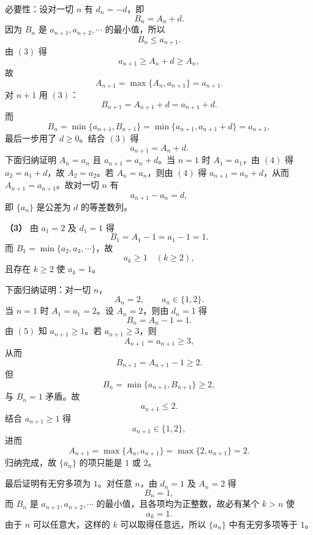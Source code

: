 \begin{answer}
必要性：设对一切 $n$ 有 $d_n=-d$，即
\nopagebreak[4]
\[B_n=A_n+d. \tag{3}\]
因为 $B_n$ 是 $a_{n+1},a_{n+2},\cdots$ 的最小值，所以
\nopagebreak[4]
\[B_n\leqslant a_{n+1}.\]
由 $(3)$ 得
\nopagebreak[4]
\[a_{n+1}\geqslant A_n+d\geqslant A_n,\]
故
\nopagebreak[4]
\[A_{n+1}=\max\{A_n,a_{n+1}\}=a_{n+1}.\]
对 $n+1$ 用 $(3)$：
\nopagebreak[4]
\[B_{n+1}=A_{n+1}+d=a_{n+1}+d.\]
而
\nopagebreak[4]
\[B_n=\min\{a_{n+1},B_{n+1}\}=\min\{a_{n+1},a_{n+1}+d\}=a_{n+1},\]
最后一步用了 $d\geqslant0$。结合 $(3)$ 得
\nopagebreak[4]
\[a_{n+1}=A_n+d. \tag{4}\]
下面归纳证明 $A_n=a_n$ 且 $a_{n+1}=a_n+d$。当 $n=1$ 时 $A_1=a_1$，由 $(4)$ 得 $a_2=a_1+d$，故 $A_2=a_2$。若 $A_n=a_n$，则由 $(4)$ 得 $a_{n+1}=a_n+d$，从而 $A_{n+1}=a_{n+1}$。故对一切 $n$ 有
\nopagebreak[4]
\[a_{n+1}-a_n=d,\]
即 $\{a_n\}$ 是公差为 $d$ 的等差数列。

\textbf{（3）} 由 $a_1=2$ 及 $d_1=1$ 得
\nopagebreak[4]
\[B_1=A_1-1=a_1-1=1.\]
而 $B_1=\min\{a_2,a_3,\cdots\}$，故
\nopagebreak[4]
\[a_k\geqslant1\quad(k\geqslant2), \tag{5}\]
且存在 $k\geqslant2$ 使 $a_k=1$。

下面归纳证明：对一切 $n$，
\nopagebreak[4]
\[A_n=2,\qquad a_n\in\{1,2\}.\]
当 $n=1$ 时 $A_1=a_1=2$。设 $A_n=2$，则由 $d_n=1$ 得
\nopagebreak[4]
\[B_n=A_n-1=1.\]
由 $(5)$ 知 $a_{n+1}\geqslant1$。若 $a_{n+1}\geqslant3$，则
\nopagebreak[4]
\[A_{n+1}=a_{n+1}\geqslant3,\]
从而
\nopagebreak[4]
\[B_{n+1}=A_{n+1}-1\geqslant2.\]
但
\nopagebreak[4]
\[B_n=\min\{a_{n+1},B_{n+1}\}\geqslant2,\]
与 $B_n=1$ 矛盾。故
\nopagebreak[4]
\[a_{n+1}\leqslant2.\]
结合 $a_{n+1}\geqslant1$ 得
\nopagebreak[4]
\[a_{n+1}\in\{1,2\},\]
进而
\nopagebreak[4]
\[A_{n+1}=\max\{A_n,a_{n+1}\}=\max\{2,a_{n+1}\}=2.\]
归纳完成，故 $\{a_n\}$ 的项只能是 $1$ 或 $2$。

最后证明有无穷多项为 $1$。对任意 $n$，由 $d_n=1$ 及 $A_n=2$ 得
\nopagebreak[4]
\[B_n=1,\]
而 $B_n$ 是 $a_{n+1},a_{n+2},\cdots$ 的最小值，且各项均为正整数，故必有某个 $k>n$ 使
\nopagebreak[4]
\[a_k=1.\]
由于 $n$ 可以任意大，这样的 $k$ 可以取得任意远，所以 $\{a_n\}$ 中有无穷多项等于 $1$。




\end{answer}